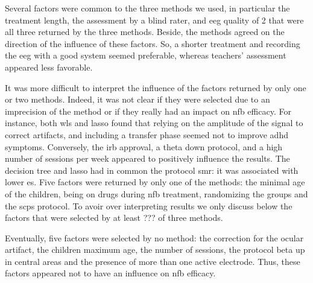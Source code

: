 Several factors were common to the three methods we used, in particular the treatment length, the assessment 
by a blind rater, and \gls{eeg} quality of 2 that were all three returned by the three methods. Beside, 
the methods agreed on the direction of the influence of these factors. So, a shorter treatment and recording the \gls{eeg} 
with a good system seemed preferable, whereas teachers' assessment appeared less favorable.

It was more difficult to interpret the influence of the factors returned by only one or two methods. Indeed, it was not clear if they were
selected due to an imprecision of the method or if they really had an impact on \gls{nfb} efficacy.
For instance, both \gls{wls} and \gls{lasso} found that relying on the amplitude of the signal to correct artifacts, and including a 
transfer phase seemed not to improve \gls{adhd} symptoms. Conversely, the \gls{irb} approval, a theta down protocol, and a high number 
of sessions per week appeared to positively influence the results. The decision tree and \gls{lasso} had in common the protocol \gls{smr}:
it was associated with lower \gls{es}. Five factors were returned by only one of the methods: the minimal age of the children, being on drugs 
during \gls{nfb} treatment, randomizing the groups and the \glspl{scp} protocol. To avoir over interpreting results we
only discuss below the factors that were selected by at least ??? of three methods. 

Eventually, five factors were selected by no method: the correction for the ocular artifact, the children maximum age, the number of sessions,
the protocol beta up in central areas and the presence of more than one active electrode. Thus, these factors appeared not to have an influence on
\gls{nfb} efficacy.   

